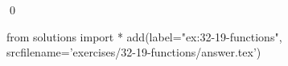 
\begin{ex}
  \label{ex:32-19-functions}
  
  \qed
\end{ex}
\begin{python0}
from solutions import *
add(label="ex:32-19-functions",
    srcfilename='exercises/32-19-functions/answer.tex')
\end{python0}
